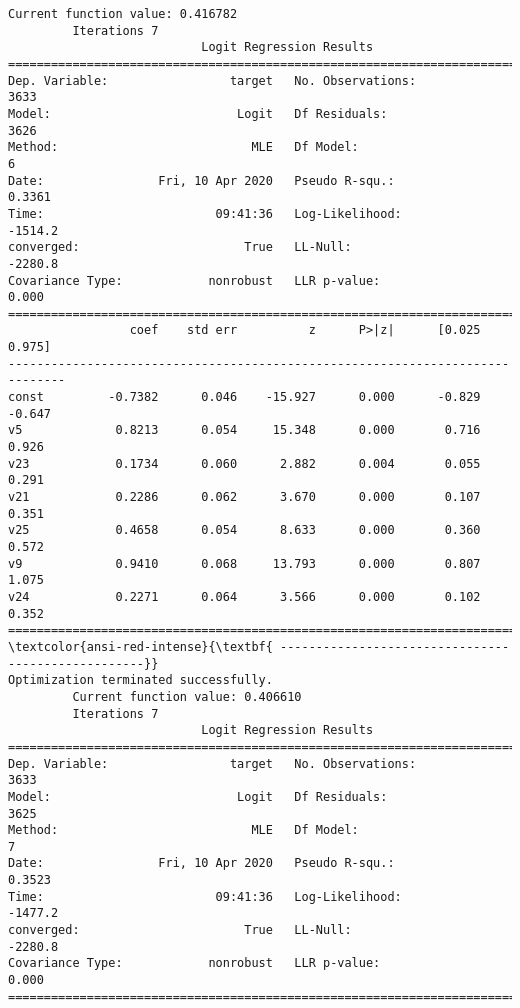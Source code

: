 \documentclass[11pt]{article}
\begin{document}
\begin{Verbatim}[commandchars=\\\{\}]
         Current function value: 0.416782
         Iterations 7
                           Logit Regression Results                           
==============================================================================
Dep. Variable:                 target   No. Observations:                 3633
Model:                          Logit   Df Residuals:                     3626
Method:                           MLE   Df Model:                            6
Date:                Fri, 10 Apr 2020   Pseudo R-squ.:                  0.3361
Time:                        09:41:36   Log-Likelihood:                -1514.2
converged:                       True   LL-Null:                       -2280.8
Covariance Type:            nonrobust   LLR p-value:                     0.000
==============================================================================
                 coef    std err          z      P>|z|      [0.025      0.975]
------------------------------------------------------------------------------
const         -0.7382      0.046    -15.927      0.000      -0.829      -0.647
v5             0.8213      0.054     15.348      0.000       0.716       0.926
v23            0.1734      0.060      2.882      0.004       0.055       0.291
v21            0.2286      0.062      3.670      0.000       0.107       0.351
v25            0.4658      0.054      8.633      0.000       0.360       0.572
v9             0.9410      0.068     13.793      0.000       0.807       1.075
v24            0.2271      0.064      3.566      0.000       0.102       0.352
==============================================================================
\textcolor{ansi-red-intense}{\textbf{ ---------------------------------------------------}}
Optimization terminated successfully.
         Current function value: 0.406610
         Iterations 7
                           Logit Regression Results                           
==============================================================================
Dep. Variable:                 target   No. Observations:                 3633
Model:                          Logit   Df Residuals:                     3625
Method:                           MLE   Df Model:                            7
Date:                Fri, 10 Apr 2020   Pseudo R-squ.:                  0.3523
Time:                        09:41:36   Log-Likelihood:                -1477.2
converged:                       True   LL-Null:                       -2280.8
Covariance Type:            nonrobust   LLR p-value:                     0.000
==============================================================================

\end{Verbatim}
\end{document}
